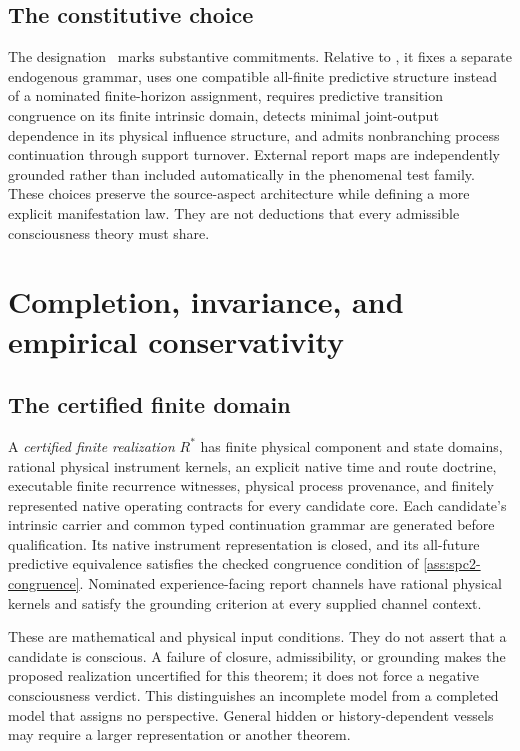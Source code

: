 \section{The constitutive choice}\label{sec:spc2-difference}
The designation \spctwo\ marks substantive commitments. Relative to \spcone, it fixes a separate endogenous grammar, uses one compatible all-finite predictive structure instead of a nominated finite-horizon assignment, requires predictive transition congruence on its finite intrinsic domain, detects minimal joint-output dependence in its physical influence structure, and admits nonbranching process continuation through support turnover. External report maps are independently grounded rather than included automatically in the phenomenal test family. These choices preserve the source-aspect architecture while defining a more explicit manifestation law. They are not deductions that every admissible consciousness theory must share.

\chapter{Completion, invariance, and empirical conservativity}\label{ch:completion}
\section{The certified finite domain}\label{section:completion:a-total-finite-construction}
A \emph{certified finite realization} $R^\ast$ has finite physical component and state domains, rational physical instrument kernels, an explicit native time and route doctrine, executable finite recurrence witnesses, physical process provenance, and finitely represented native operating contracts for every candidate core. Each candidate's intrinsic carrier and common typed continuation grammar are generated before qualification. Its native instrument representation is closed, and its all-future predictive equivalence satisfies the checked congruence condition of \cref{ass:spc2-congruence}. Nominated experience-facing report channels have rational physical kernels and satisfy the grounding criterion at every supplied channel context.

These are mathematical and physical input conditions. They do not assert that a candidate is conscious. A failure of closure, admissibility, or grounding makes the proposed realization uncertified for this theorem; it does not force a negative consciousness verdict. This distinguishes an incomplete model from a completed model that assigns no perspective. General hidden or history-dependent vessels may require a larger representation or another theorem.

